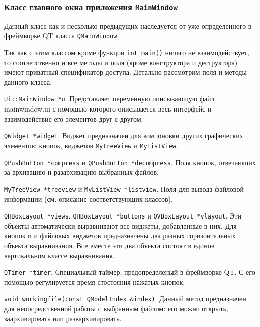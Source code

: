 \subsubsection{Класс главного окна приложения \texttt{MainWindow}}

Данный класс как и несколько предыдущих наследуется от уже определенного в фреймворке QT класса \texttt{QMainWindow}\cite{QT}.



Так как с этим классом кроме функции \texttt{int main()} ничего не взаимодействует, то соответственно и все методы и поля (кроме конструктора и деструктора) имеют приватный спецификатор доступа.
Детально рассмотрим поля и методы данного класса.



\texttt{Ui::MainWindow *u}\cite{QT}.
Представляет переменную описывающую файл mainwindow.ui с помощью которого описывается весь интерфейс и взаимодействие его элементов друг с другом.



\texttt{QWidget *widget}\cite{QT}.
Виджет предназначен для компоновки других графических элементов: кнопок, виджетов \texttt{MyTreeView} и \texttt{MyListView}.



\texttt{QPushButton *compress} и \texttt{QPushButton *decompress}\cite{QT}.
Поля кнопок, отвечающих за архивацию и разархивацию выбранных файлов.



\texttt{MyTreeView *treeview} и \texttt{MyListView *listview}.
Поля для вывода файловой информации (см. описание соответствующих классов).



\texttt{QHBoxLayout *views}, \texttt{QHBoxLayout *buttons} и \texttt{QVBoxLayout *vlayout}\cite{QT}.
Эти объекты автоматически выравнивают все виджеты, добавленные в них. 
Для кнопок и и файловых виджетов предназначены два разных горизонтальных объекта выравнивания.
Все вместе эти два объекта состоят в единов вертикальном классе выравнивания.



\texttt{QTimer *timer}\cite{QT}.
Специальный таймер, предопределеный в фреймворке QT.  
С его помощью регулируется время стостояния нажатых кнопок.



\texttt{void working{\textunderscore}file(const QModelIndex \&index)}.
Данный метод предназначен для непосредственной работы с выбранным файлом: его можно открыть, заархивировать или развархивировать.



